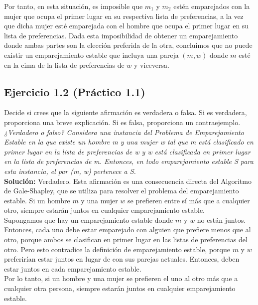 \documentclass{article}
\begin{document}
Por tanto, en esta situación, es imposible que $m_1$ y $m_2$ estén emparejados con la mujer que ocupa el primer lugar en su respectiva lista de preferencias, a la vez que dicha mujer esté emparejada con el hombre que ocupa el primer lugar en su lista de preferencias. Dada esta imposibilidad de obtener un emparejamiento donde ambas partes son la elección preferida de la otra, concluimos que no puede existir un emparejamiento estable que incluya una pareja $(m, w)$ donde $m$ esté en la cima de la lista de preferencias de $w$ y viceversa.

\newpage

\subsection{Ejercicio 1.2 (Práctico 1.1) }
Decide si crees que la siguiente afirmación es verdadera o falsa. Si es verdadera, proporciona una breve explicación. Si es falsa, proporciona un contraejemplo.\\

\emph{¿Verdadero o falso? Considera una instancia del Problema de Emparejamiento Estable en la que existe un hombre m y una mujer w tal que m está clasificado en primer lugar en la lista de preferencias de w y w está clasificada en primer lugar en la lista de preferencias de m. Entonces, en todo emparejamiento estable S para esta instancia, el par (m, w) pertenece a S.}\\

\textbf{Solución:} Verdadero. Esta afirmación es una consecuencia directa del Algoritmo de Gale-Shapley, que se utiliza para resolver el problema del emparejamiento estable. Si un hombre $m$ y una mujer $w$ se prefieren entre sí más que a cualquier otro, siempre estarán juntos en cualquier emparejamiento estable.\\

Supongamos que hay un emparejamiento estable donde $m$ y $w$ no están juntos. Entonces, cada uno debe estar emparejado con alguien que prefiere menos que al otro, porque ambos se clasifican en primer lugar en las listas de preferencias del otro. Pero esto contradice la definición de emparejamiento estable, porque $m$ y $w$ preferirían estar juntos en lugar de con sus parejas actuales. Entonces, deben estar juntos en cada emparejamiento estable.\\

Por lo tanto, si un hombre y una mujer se prefieren el uno al otro más que a cualquier otra persona, siempre estarán juntos en cualquier emparejamiento estable.
\end{document}
